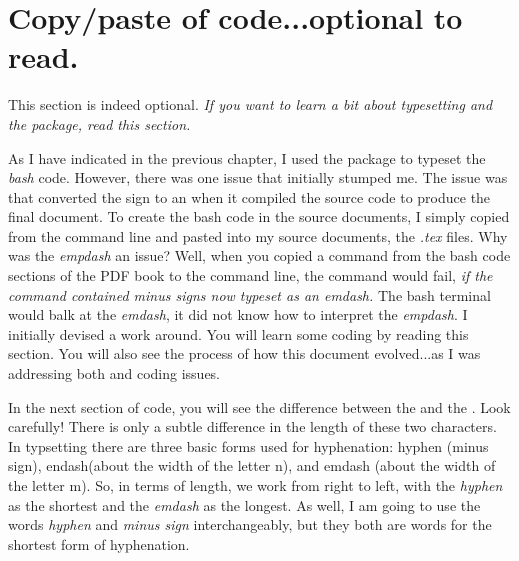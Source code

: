 \section{\color{red}Copy/paste of code...optional to read.}

This section is indeed optional. \textit{If you want to learn a bit about typesetting \latex and the  package, read this section.}

As I have indicated in the previous chapter, I used the \latex {} package to typeset the \emph{bash} code. However, there was one issue that initially stumped me. The issue was that \latex converted the  sign to an  when it compiled the source code to produce the final  document. To create the bash code in the source documents, I simply copied from the command line and pasted into my \latex source documents, the \emph{.tex} files. Why was the \emph{empdash} an issue? Well, when you copied a command from the bash code sections of the PDF book to the command line, the command would fail, \textit{if the command contained minus signs now typeset as an emdash.} The bash terminal would balk at the \emph{emdash}, it did not know how to interpret the \emph{empdash}. I initially devised a work around. You will learn some coding by reading this section. You will also see the process of how this document evolved...as I was addressing both \latex and  coding issues.


In the next section of code, you will see the difference between the  and the . Look carefully! There is only a subtle difference in the length of these two characters. In typsetting there are three basic forms used for hyphenation: hyphen (minus sign), endash(about the width of the letter n), and emdash (about the width of the letter m). So, in terms of length, we work from right to left, with the \emph{hyphen} as the shortest and the \emph{emdash} as the longest. As well, I am going to use the words \emph{hyphen} and \emph{minus sign} interchangeably, but they both are words for the shortest form of hyphenation.

